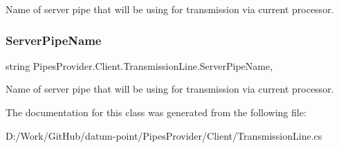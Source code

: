 Name of server pipe that will be using for transmission via current processor. 

\mbox{\label{class_pipes_provider_1_1_client_1_1_transmission_line_aa7e8a85952e05718b1a0ff96b9874766}} 
\subsubsection{\texorpdfstring{Server\+Pipe\+Name}{ServerPipeName}}
{\footnotesize\ttfamily string Pipes\+Provider.\+Client.\+Transmission\+Line.\+Server\+Pipe\+Name\hspace{0.3cm}{\ttfamily [get]}, {}}



Name of server pipe that will be using for transmission via current processor. 



The documentation for this class was generated from the following file\+:\begin{DoxyCompactItemize}
\item 
D\+:/\+Work/\+Git\+Hub/datum-\/point/\+Pipes\+Provider/\+Client/Transmission\+Line.\+cs\end{DoxyCompactItemize}
